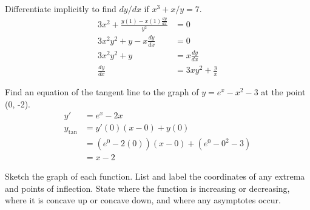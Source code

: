 \documentclass[12pt]{article}
\newenvironment{problem}[2][]{
    \begin{trivlist}
        \item[
            {\bfseries #1}
            {\bfseries #2.}
        ]
}{\end{trivlist}}
\newcommand{\Problem}[1]{\bigskip \noindent #1}
\begin{document}
\begin{problem}{23}
    Differentiate implicitly to find $dy/dx$ if $x^3 + x/y = 7$.
    \begin{align}
        3x^2 + \frac{y \left(1\right) - x \left(1\right) \frac{dy}{dx}}{y^2} &= 0 \\
        3x^2y^2 + y - x \frac{dy}{dx} &= 0 \\
        3x^2y^2 + y &= x \frac{dy}{dx} \\
        \frac{dy}{dx} &= 3xy^2 + \frac{y}{x}
    \end{align}
\end{problem}

\begin{problem}{24}
    Find an equation of the tangent line to the graph of $y = e^x - x^2 - 3$ at the point (0, -2).
    \begin{align}
        y' &= e^x - 2x \\
        y_\tan &= y'(0) (x - 0) + y(0) \\
        &= \left(e^0 - 2(0)\right) \left(x - 0\right) + \left(e^0 - 0^2 - 3\right) \\
        &= x - 2
    \end{align}
\end{problem}

\Problem{Sketch the graph of each function.
List and label the coordinates of any extrema and points of inflection.
State where the function is increasing or decreasing, where it is concave up or concave down, and where any asymptotes occur.}
\end{document}
